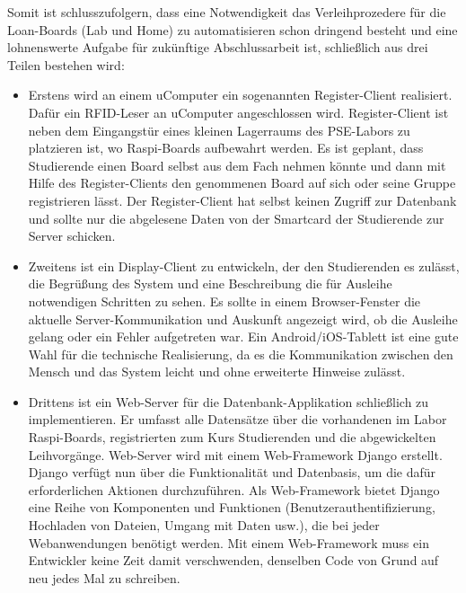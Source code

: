 Somit ist schlusszufolgern, dass eine Notwendigkeit das Verleihprozedere für die Loan-Boards (Lab und Home) zu automatisieren schon dringend besteht und eine lohnenswerte Aufgabe für zukünftige Abschlussarbeit ist, schließlich aus drei Teilen bestehen wird:
\begin{itemize}
	\item Erstens wird an einem uComputer ein sogenannten Register-Client realisiert. Dafür ein RFID-Leser an uComputer angeschlossen wird. Register-Client ist neben dem Eingangstür eines kleinen Lagerraums des PSE-Labors zu platzieren ist, wo Raspi-Boards aufbewahrt werden. Es ist geplant, dass Studierende einen Board selbst aus dem Fach nehmen könnte und dann mit Hilfe des Register-Clients den genommenen Board auf sich oder seine Gruppe registrieren lässt. Der Register-Client hat selbst keinen Zugriff zur Datenbank und sollte nur die abgelesene Daten von der Smartcard der Studierende zur Server schicken. 
	\item Zweitens ist ein Display-Client zu entwickeln, der den Studierenden es zulässt, die Begrüßung des System und eine Beschreibung die für Ausleihe notwendigen Schritten zu sehen. Es sollte in einem Browser-Fenster die aktuelle Server-Kommunikation und Auskunft angezeigt wird, ob die Ausleihe gelang oder ein Fehler aufgetreten war. Ein Android/iOS-Tablett ist eine gute Wahl für die technische Realisierung, da es die Kommunikation zwischen den Mensch und das System leicht und ohne erweiterte Hinweise zulässt. 
	\item Drittens ist ein Web-Server für die Datenbank-Applikation schließlich zu implementieren. Er umfasst alle Datensätze über die vorhandenen im Labor Raspi-Boards, registrierten zum Kurs Studierenden und die abgewickelten Leihvorgänge.  Web-Server wird mit einem Web-Framework Django erstellt. Django verfügt nun über die Funktionalität und Datenbasis, um die dafür erforderlichen Aktionen durchzuführen. Als Web-Framework bietet Django eine Reihe von Komponenten und Funktionen (Benutzerauthentifizierung, Hochladen von Dateien, Umgang mit Daten usw.), die bei jeder Webanwendungen benötigt werden. Mit einem Web-Framework muss ein Entwickler keine Zeit damit verschwenden, denselben Code von Grund auf neu jedes Mal zu schreiben.
\end{itemize}

